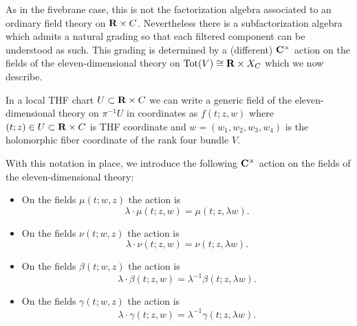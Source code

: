 \documentclass[11pt]{amsart}
\begin{document}
As in the fivebrane case, this is not the factorization algebra associated to an ordinary field theory on $\mathbf{R} \times C$.
Nevertheless there is a subfactorization algebra which admits a natural grading so that each filtered component can be understood as such.
This grading is determined by a (different) $\mathbf{C}^\times$ action on the fields of the eleven-dimensional theory on ${\rm Tot}(V) \cong \mathbf{R} \times X_C$ which we now describe. 

In a local THF chart $U \subset \mathbf{R} \times C$ we can write a generic field of the eleven-dimensional theory on $\pi^{-1} U$ in coordinates as $f(t;z,w)$ where $(t;z) \in U \subset\mathbf{R} \times C$ is THF coordinate and $w=(w_1,w_2,w_3,w_4)$ is the holomorphic fiber coordinate of the rank four bundle $V$.

%
%
%
%

With this notation in place, we introduce the following $\mathbf{C}^\times$ action on the fields of the eleven-dimensional theory:
\begin{itemize}
\item On the fields $\mu(t;w,z)$ the action is
\[
\lambda \cdot \mu(t;z,w) = \mu(t; z , \lambda w).
\]
\item On the fields $\nu(t;w,z)$ the action is
\[
\lambda \cdot \nu(t;z,w) = \nu(t;z ,\lambda w).
\]
\item On the fields $\beta(t;w,z)$ the action is
\[
\lambda \cdot \beta(t;z,w) = \lambda^{-1} \beta(t; z, \lambda w).
\]
\item On the fields $\gamma(t;w,z)$ the action is
\[
\lambda \cdot \gamma(t;z,w) = \lambda^{-1} \gamma(t; z ,\lambda w).
\]
\end{itemize}
 
\end{document}
